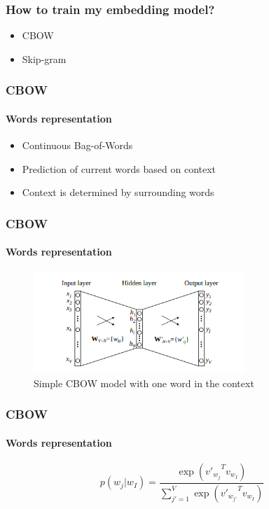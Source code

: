 
\begin{frame}
\frametitle{How to train my embedding model?}
	
	\begin{itemize}
		\item CBOW
		\item Skip-gram
	\end{itemize}

\end{frame}

\begin{frame}
\frametitle{CBOW}
	\framesubtitle{Words representation}

	\begin{itemize}
		\item Continuous Bag-of-Words
		\item Prediction of current words based on context
		\item Context is determined by surrounding words
	\end{itemize}

\end{frame}

\begin{frame}
\frametitle{CBOW}
	\framesubtitle{Words representation}
%
	\begin{figure}
		\includegraphics[width=8cm]{./figures/cbow_simple}
		\caption{Simple CBOW model with one word in the context}
	\end{figure}

\end{frame}


\begin{frame}
\frametitle{CBOW}
	\framesubtitle{Words representation}


$$p(w_j|w_I)= \frac{\exp({v'_{w_j}}^{T}v_{w_I})}{ \sum_{j'=1}^{V} \exp({v'_{w_{j'}}}^{T}v_{w_I})}$$

\end{frame}


